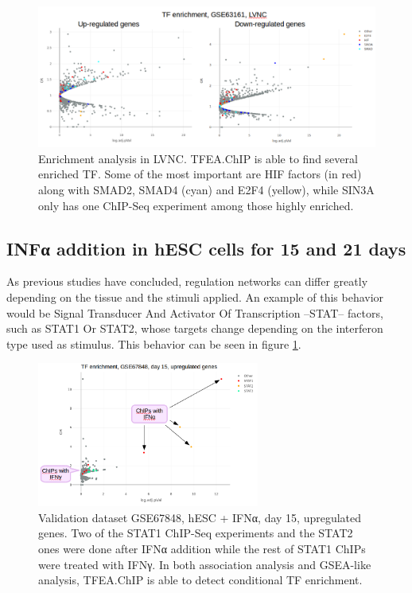 \documentclass[a4paper, 12pt ]{article}
\begin{document}
\begin{figure}[h]
	\centering
	\includegraphics[width=\textwidth]{graf-op2}
	\caption{Enrichment analysis in LVNC. TFEA.ChIP is able to find several enriched TF. Some of the most important are HIF factors (in red) along with SMAD2, SMAD4 (cyan) and E2F4 (yellow), while SIN3A only has one ChIP-Seq experiment among those highly	enriched.}
\end{figure}

\subsection*{INFα addition in hESC cells for 15 and 21 days}
As previous studies have concluded\cite{geneReg}, regulation networks can differ greatly depending on the tissue and the stimuli applied. An example of this behavior would be Signal Transducer And Activator Of Transcription –STAT– factors, such as STAT1 Or STAT2, whose targets change depending on the interferon type used as stimulus. This behavior can be seen in figure \ref{fig6}.
\newline
\newline
\newline

\begin{figure}
	\centering
	\includegraphics[width=0.65\textwidth]{graf-op3}
	\caption{Validation dataset GSE67848, hESC + IFNα, day 15, upregulated genes.  Two of the STAT1 ChIP-Seq experiments and the STAT2 ones were done after IFNα addition while the rest of STAT1 ChIPs were treated with IFNγ. In both association analysis and GSEA-like analysis, TFEA.ChIP is able to detect conditional TF enrichment.}
	\label{fig6}
\end{figure}
\end{document}
